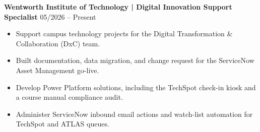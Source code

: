 \noindent
\textbf{Wentworth Institute of Technology | Digital Innovation Support Specialist} \hfill 05/2026 -- Present
\begin{itemize}
    \item Support campus technology projects for the Digital Transformation \& Collaboration (DxC) team.
    \item Built documentation, data migration, and change request for the ServiceNow Asset Management go-live.
    \item Develop Power Platform solutions, including the TechSpot check-in kiosk and a course manual compliance audit.
    \item Administer ServiceNow inbound email actions and watch-list automation for TechSpot and ATLAS queues.
\end{itemize}
